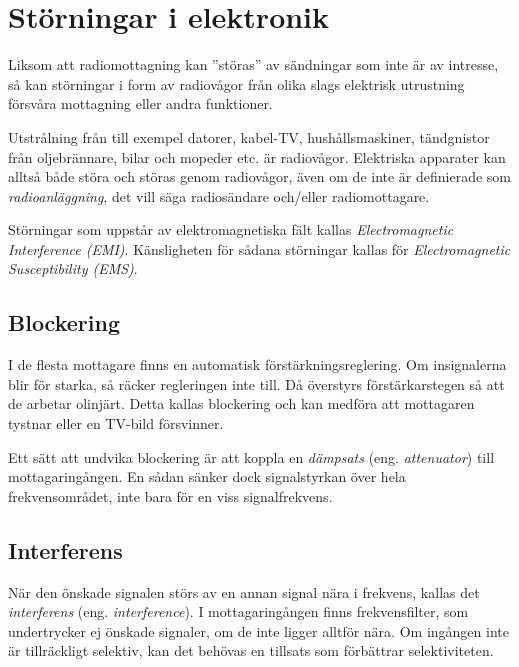 \section{Störningar i elektronik}

Liksom att radiomottagning kan ''störas'' av sändningar som inte är av
intresse, så kan störningar i form av radiovågor från olika slags
elektrisk utrustning försvåra mottagning eller andra funktioner.

Utstrålning från till exempel datorer, kabel-TV, hushållsmaskiner,
tändgnistor från oljebrännare, bilar och mopeder etc. är radiovågor.
Elektriska apparater kan alltså både störa och störas genom
radiovågor, även om de inte är definierade som \emph{radioanläggning},
det vill säga radiosändare och/eller radiomottagare.

Störningar som uppstår av elektromagnetiska fält kallas
\emph{Electromagnetic Interference (EMI)}.
Känsligheten för sådana störningar kallas för
\emph{Electromagnetic Susceptibility (EMS)}.

\subsection{Blockering}
\label{blockering}

I de flesta mottagare finns en automatisk förstärkningsreglering.
Om insignalerna blir för starka, så räcker regleringen inte till.
Då överstyrs förstärkarstegen så att de arbetar olinjärt.
Detta kallas blockering och kan medföra att mottagaren tystnar eller en TV-bild
försvinner.

Ett sätt att undvika blockering är att koppla en \emph{dämpsats}
(eng. \emph{attenuator}) till mottagaringången.
En sådan sänker dock signalstyrkan över hela frekvensområdet, inte bara för en
viss signalfrekvens.

\subsection{Interferens}

När den önskade signalen störs av en annan signal nära i frekvens, kallas det
\emph{interferens} (eng. \emph{interference}).
I mottagaringången finns frekvensfilter, som undertrycker ej önskade signaler,
om de inte ligger alltför nära.
Om ingången inte är tillräckligt selektiv, kan det behövas en tillsats som
förbättrar selektiviteten.

